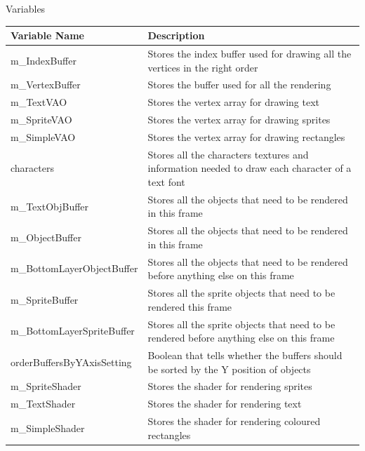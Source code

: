 \documentclass[../../Main.tex]{subfiles}
\begin{document}
    \begin{center}
        Variables
        \begin{tabular}{ | m{} | m{} | }
            \hline
            \textbf{Variable Name} & \textbf{Description} \\
            \hline
            m\_IndexBuffer & Stores the index buffer used for drawing all the vertices in the right order \\
            \hline
            m\_VertexBuffer & Stores the buffer used for all the rendering \\
            \hline
            m\_TextVAO & Stores the vertex array for drawing text \\
            \hline
            m\_SpriteVAO & Stores the vertex array for drawing sprites\\
            \hline
            m\_SimpleVAO & Stores the vertex array for drawing rectangles\\
            \hline
            characters & Stores all the characters textures and information needed to draw each character of a text font \\
            \hline
            m\_TextObjBuffer & Stores all the objects that need to be rendered in this frame \\
            \hline
            m\_ObjectBuffer & Stores all the objects that need to be rendered in this frame \\
            \hline
            m\_BottomLayerObjectBuffer & Stores all the objects that need to be rendered before anything else on this frame \\
            \hline
            m\_SpriteBuffer & Stores all the sprite objects that need to be rendered this frame \\
            \hline
            m\_BottomLayerSpriteBuffer & Stores all the sprite objects that need to be rendered before anything else on this frame \\
            \hline
            orderBuffersByYAxisSetting & Boolean that tells whether the buffers should be sorted by the Y position of objects \\
            \hline
            m\_SpriteShader & Stores the shader for rendering sprites \\
            \hline
            m\_TextShader & Stores the shader for rendering text \\
            \hline
            m\_SimpleShader & Stores the shader for rendering coloured rectangles \\

\end{tabular}
\end{center}
\end{document}
